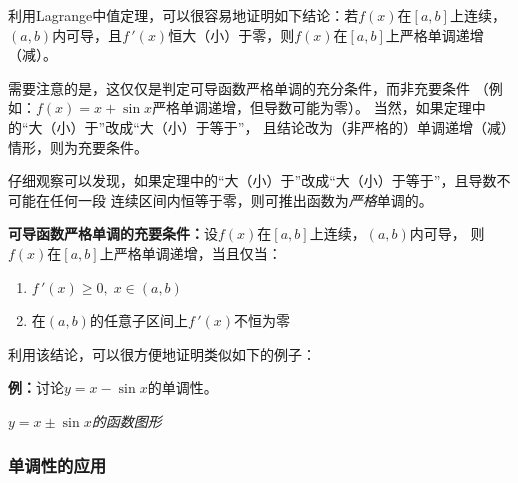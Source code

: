 利用Lagrange中值定理，可以很容易地证明如下结论：若$f(x)$在$[a,b]$上连续，
$(a,b)$内可导，且$f\,'(x)$恒大（小）于零，则$f(x)$在$[a,b]$上严格单调递增（减）。

需要注意的是，这仅仅是判定可导函数严格单调的充分条件，而非充要条件
（例如：$f(x)=x+\sin x$严格单调递增，但导数可能为零）。
当然，如果定理中的“大（小）于”改成“大（小）于等于”，
且结论改为（非严格的）单调递增（减）情形，则为充要条件。

仔细观察可以发现，如果定理中的“大（小）于”改成“大（小）于等于”，且导数不可能在任何一段
连续区间内恒等于零，则可推出函数为{\it 严格}单调的。

\begin{thx}
	{\bf 可导函数严格单调的充要条件：}设$f(x)$在$[a,b]$上连续，$(a,b)$内可导，
	则$f(x)$在$[a,b]$上严格单调递增，当且仅当：
	\begin{enumerate}[(1)]
	  \item $f\,'(x)\geq 0,\;x\in(a,b)$
	  \item 在$(a,b)$的任意子区间上$f\,'(x)$不恒为零
	\end{enumerate}
\end{thx}

利用该结论，可以很方便地证明类似如下的例子：

{\bf 例：}讨论$y=x-\sin x$的单调性。

\begin{center}
	
	{\it $y=x\pm\sin x$的函数图形}
\end{center}

\subsubsection{单调性的应用}

